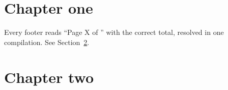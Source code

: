 \documentclass{article}
\begin{document}
\section{Chapter one}\label{sec:one}
Every footer reads ``Page X of \lastpage'' with the correct total,
resolved in one compilation. See Section~\ref{sec:two}.
\lipsum[1-8]

\section{Chapter two}\label{sec:two}
\lipsum[1-8]
\end{document}
